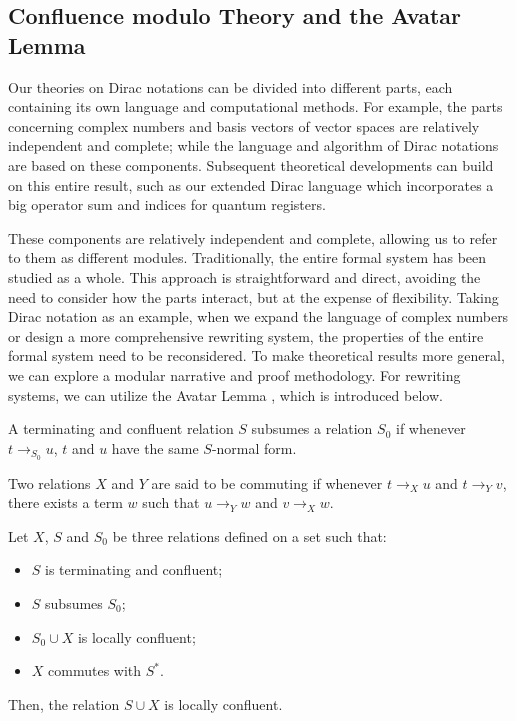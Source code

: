 \documentclass[manuscript, review, timestamp]{acmart}
\begin{document}
\subsection{Confluence modulo Theory and the Avatar Lemma}

Our theories on Dirac notations can be divided into different parts, each containing its own language and computational methods. For example, the parts concerning complex numbers and basis vectors of vector spaces are relatively independent and complete; while the language and algorithm of Dirac notations are based on these components. Subsequent theoretical developments can build on this entire result, such as our extended Dirac language which incorporates a big operator sum and indices for quantum registers.

These components are relatively independent and complete, allowing us to refer to them as different modules. Traditionally, the entire formal system has been studied as a whole. This approach is straightforward and direct, avoiding the need to consider how the parts interact, but at the expense of flexibility. Taking Dirac notation as an example, when we expand the language of complex numbers or design a more comprehensive rewriting system, the properties of the entire formal system need to be reconsidered. To make theoretical results more general, we can explore a modular narrative and proof methodology. For rewriting systems, we can utilize the Avatar Lemma \cite{Arrighi2005}\cite{Arrighi2017}, which is introduced below.



\begin{definition}[Subsumption]
  A terminating and confluent relation $S$ subsumes a relation $S_0$ if whenever $t \to_{S_0} u$, $t$ and $u$ have the same $S$-normal form.
\end{definition}

\begin{definition}
  Two relations $X$ and $Y$ are said to be commuting if whenever $t \to_X u$ and $t \to_Y v$, there exists a term $w$ such that $u \to_Y w$ and $v \to_X w$.
\end{definition}

\begin{lemma} \cite{Arrighi2005} Let $X$, $S$ and $S_0$ be three relations defined on a set such that:
  \begin{itemize}
    \item $S$ is terminating and confluent;
    \item $S$ subsumes $S_0$;
    \item $S_0 \cup X$ is locally confluent;
    \item $X$ commutes with $S^*$.
  \end{itemize}
  Then, the relation $S \cup X$ is locally confluent.
\end{lemma}
\end{document}

